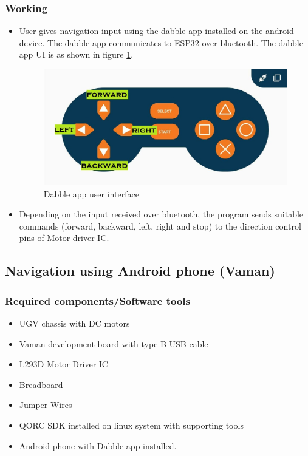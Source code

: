 \subsubsection{Working}
\begin{itemize}
    \item User gives navigation input using the dabble app installed on the android device. The dabble app communicates to ESP32 over bluetooth. The dabble app UI is as shown in figure \ref{Dabble_app_UI}.
    
    \begin{figure}[h!]
    \caption{Dabble app user interface}
    \label{Dabble_app_UI}
    \centering
    \includegraphics[width=12cm]{./Figures/Dabble_app_UI.jpg}
    \end{figure}
    \item Depending on the input received over bluetooth, the program sends suitable commands (forward, backward, left, right and stop) to the direction control pins of Motor driver IC.
\end{itemize}

\subsection{Navigation using Android phone (Vaman)} 
\subsubsection{Required components/Software tools}
\begin{itemize}
    \item  UGV chassis with DC motors
    \item  Vaman development board with type-B USB cable
    \item  L293D Motor Driver IC
    \item  Breadboard
    \item  Jumper Wires
    \item  QORC SDK installed on linux system with supporting tools
    \item  Android phone with Dabble app installed.
\end{itemize}



